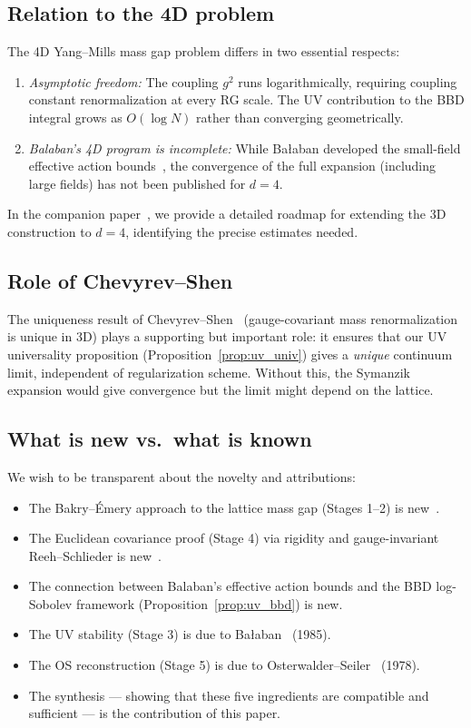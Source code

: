 \documentclass[11pt,a4paper]{article}
\theoremstyle{plain}
\theoremstyle{definition}
\theoremstyle{remark}
\begin{document}
\subsection{Relation to the 4D problem}

The 4D Yang--Mills mass gap problem differs in two
essential respects:
\begin{enumerate}[label=(\roman*)]
  \item \emph{Asymptotic freedom:} The coupling $g^2$
    runs logarithmically, requiring coupling constant
    renormalization at every RG scale. The UV contribution
    to the BBD integral grows as $O(\log N)$ rather than
    converging geometrically.
  \item \emph{Balaban's 4D program is incomplete:}
    While Ba{\l}aban developed the small-field
    effective action bounds~\cite{Bal87,Bal88a,Bal88b},
    the convergence of the full expansion (including
    large fields) has not been published for $d=4$.
\end{enumerate}
In the companion paper~\cite{FontesDimock}, we provide
a detailed roadmap for extending the 3D construction
to $d=4$, identifying the precise estimates needed.

\subsection{Role of Chevyrev--Shen}

The uniqueness result of Chevyrev--Shen~\cite{CS25}
(gauge-covariant mass renormalization is unique in 3D)
plays a supporting but important role: it ensures
that our UV universality proposition
(Proposition~\ref{prop:uv_univ}) gives a
\emph{unique} continuum limit, independent of
regularization scheme. Without this, the Symanzik
expansion would give convergence but the limit
might depend on the lattice.

\subsection{What is new vs.\ what is known}

We wish to be transparent about the novelty and
attributions:
\begin{itemize}[nosep]
  \item The Bakry--\'Emery approach to the lattice
    mass gap (Stages 1--2) is new~\cite{FontesLattice,FontesUniform,FontesBBD}.
  \item The Euclidean covariance proof (Stage 4)
    via rigidity and gauge-invariant Reeh--Schlieder
    is new~\cite{FontesEuclidean}.
  \item The connection between Balaban's effective
    action bounds and the BBD log-Sobolev framework
    (Proposition~\ref{prop:uv_bbd}) is new.
  \item The UV stability (Stage 3) is due to
    Ba{\l}aban~\cite{Bal85e} (1985).
  \item The OS reconstruction (Stage 5) is due to
    Osterwalder--Seiler~\cite{OS78} (1978).
  \item The synthesis --- showing that these five
    ingredients are compatible and sufficient ---
    is the contribution of this paper.
\end{itemize}
\end{document}
